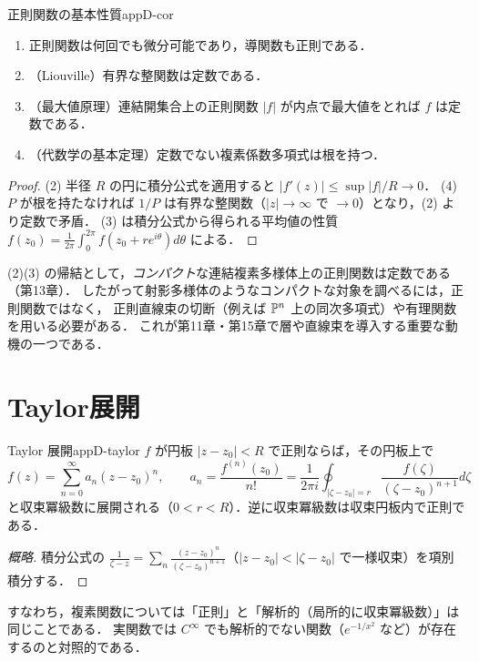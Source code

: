 \begin{mycor}{正則関数の基本性質}{appD-cor}
\begin{enumerate}
\item 正則関数は何回でも微分可能であり，導関数も正則である．
\item （Liouville）有界な整関数は定数である．
\item （最大値原理）連結開集合上の正則関数 $|f|$ が内点で最大値をとれば $f$ は定数である．
\item （代数学の基本定理）定数でない複素係数多項式は根を持つ．
\end{enumerate}
\end{mycor}
\begin{proof}
(2) 半径 $R$ の円に積分公式を適用すると $|f'(z)|\leq\sup|f|/R\to0$．
(4) $P$ が根を持たなければ $1/P$ は有界な整関数（$|z|\to\infty$ で $\to0$）となり，(2) より定数で矛盾．
(3) は積分公式から得られる平均値の性質 $f(z_0)=\frac1{2\pi}\int_0^{2\pi}f(z_0+re^{i\theta})d\theta$ による．
\end{proof}

\begin{note}
(2)(3) の帰結として，\emph{コンパクト}な連結複素多様体上の正則関数は定数である（第13章）．
したがって射影多様体のようなコンパクトな対象を調べるには，正則関数ではなく，
正則直線束の切断（例えば $\mathbb{P}^n$ 上の同次多項式）や有理関数を用いる必要がある．
これが第11章・第15章で層や直線束を導入する重要な動機の一つである．
\end{note}

\section{Taylor展開}

\begin{mythm}{Taylor 展開}{appD-taylor}
$f$ が円板 $|z-z_0|<R$ で正則ならば，その円板上で
\[
f(z)=\sum_{n=0}^\infty a_n(z-z_0)^n,\qquad a_n=\frac{f^{(n)}(z_0)}{n!}=\frac1{2\pi i}\oint_{|\zeta-z_0|=r}\frac{f(\zeta)}{(\zeta-z_0)^{n+1}}d\zeta
\]
と収束冪級数に展開される（$0<r<R$）．逆に収束冪級数は収束円板内で正則である．
\end{mythm}
\begin{proof}[概略]
積分公式の $\frac1{\zeta-z}=\sum_n\frac{(z-z_0)^n}{(\zeta-z_0)^{n+1}}$（$|z-z_0|<|\zeta-z_0|$ で一様収束）を項別積分する．
\end{proof}

すなわち，複素関数については「正則」と「解析的（局所的に収束冪級数）」は同じことである．
実関数では $C^\infty$ でも解析的でない関数（$e^{-1/x^2}$ など）が存在するのと対照的である．


